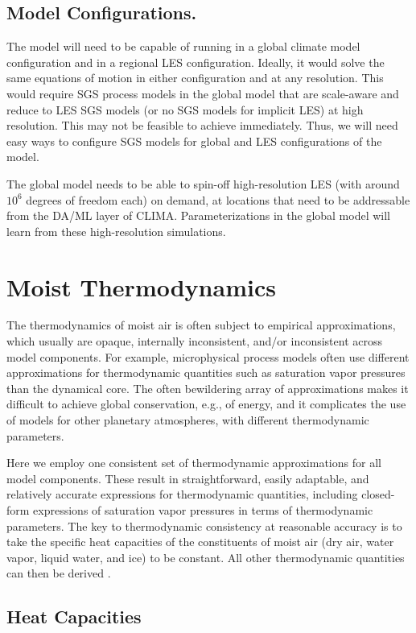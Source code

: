 \documentclass{article}
\begin{document}
\subsection{Model Configurations.} The model will need to be capable of running in a global climate model configuration and in a regional LES configuration. Ideally, it would solve the same equations of motion in either configuration and at any resolution. This would require SGS process models in the global model that are scale-aware and reduce to LES SGS models (or no SGS models for implicit LES) at high resolution. This may not be feasible to achieve immediately. Thus, we will need easy ways to configure SGS models for global and LES configurations of the model. 

The global model needs to be able to spin-off high-resolution LES (with around $10^6$ degrees of freedom each) on demand, at locations that need to be addressable from the DA/ML layer of CLIMA. Parameterizations in the global model will learn from these high-resolution simulations. 

\section{Moist Thermodynamics}\label{s:thermodynamics}

The thermodynamics of moist air is often subject to empirical approximations, which usually are opaque, internally inconsistent, and/or inconsistent across model components. For example, microphysical process models often use different approximations for thermodynamic quantities such as saturation vapor pressures than the dynamical core. The often bewildering array of approximations makes it difficult to achieve global conservation, e.g., of energy, and it complicates the use of models for other planetary atmospheres, with different thermodynamic parameters. 

Here we employ one consistent set of thermodynamic approximations for all model components. These result in straightforward, easily adaptable, and relatively accurate expressions for thermodynamic quantities, including closed-form expressions of saturation vapor pressures in terms of thermodynamic parameters. The key to thermodynamic consistency at reasonable accuracy is to take the specific heat capacities of the constituents of moist air (dry air, water vapor, liquid water, and ice) to be constant. All other thermodynamic quantities can then be derived \citep[cf.][]{Romps08a}. 

\subsection{Heat Capacities}\label{s:heat_capacities}
\end{document}
